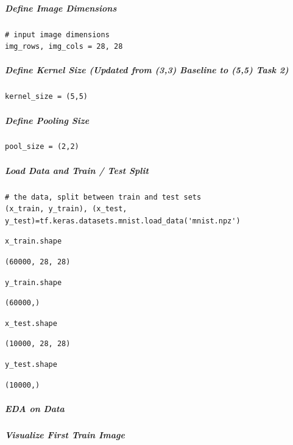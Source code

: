 \subparagraph{Define Image Dimensions}

\begin{verbatim}
# input image dimensions
img_rows, img_cols = 28, 28
\end{verbatim}

\subparagraph{Define Kernel Size (Updated from (3,3) Baseline to (5,5) Task 2)}

\begin{verbatim}
kernel_size = (5,5)
\end{verbatim}

\subparagraph{Define Pooling Size}

\begin{verbatim}
pool_size = (2,2)
\end{verbatim}

\subparagraph{Load Data and Train / Test Split}

\begin{verbatim}
# the data, split between train and test sets
(x_train, y_train), (x_test, y_test)=tf.keras.datasets.mnist.load_data('mnist.npz')
\end{verbatim}

\begin{verbatim}
x_train.shape
\end{verbatim}

\begin{verbatim}
(60000, 28, 28)
\end{verbatim}

\begin{verbatim}
y_train.shape
\end{verbatim}

\begin{verbatim}
(60000,)
\end{verbatim}

\begin{verbatim}
x_test.shape
\end{verbatim}

\begin{verbatim}
(10000, 28, 28)
\end{verbatim}

\begin{verbatim}
y_test.shape
\end{verbatim}

\begin{verbatim}
(10000,)
\end{verbatim}

\subparagraph{EDA on Data}

\subparagraph{Visualize First Train Image}

